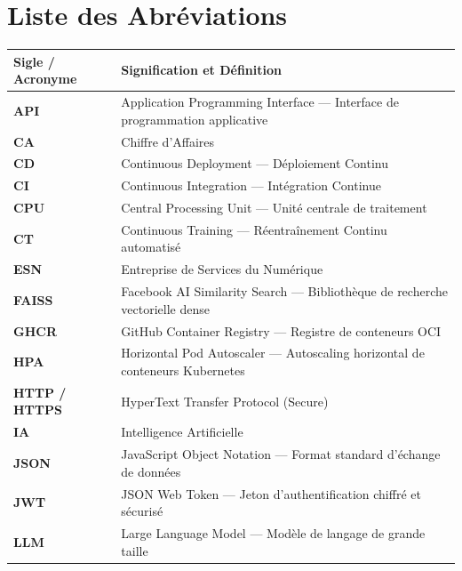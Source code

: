 \documentclass[11pt,a4paper,oneside]{report}
\begin{document}
\vspace{0.5cm}
\listoftables
{}
\newpage

\section*{Liste des Abréviations}

\noindent
\begin{center}
\small
{}
\begin{tabularx}{\textwidth}{@{}p{3.2cm}X@{}}
\toprule
\textbf{Sigle / Acronyme} & \textbf{Signification et Définition} \\ \midrule
\textbf{API} & Application Programming Interface --- Interface de programmation applicative \\
\textbf{CA} & Chiffre d'Affaires \\
\textbf{CD} & Continuous Deployment --- Déploiement Continu \\
\textbf{CI} & Continuous Integration --- Intégration Continue \\
\textbf{CPU} & Central Processing Unit --- Unité centrale de traitement \\
\textbf{CT} & Continuous Training --- Réentraînement Continu automatisé \\
\textbf{ESN} & Entreprise de Services du Numérique \\
\textbf{FAISS} & Facebook AI Similarity Search --- Bibliothèque de recherche vectorielle dense \\
\textbf{GHCR} & GitHub Container Registry --- Registre de conteneurs OCI \\
\textbf{HPA} & Horizontal Pod Autoscaler --- Autoscaling horizontal de conteneurs Kubernetes \\
\textbf{HTTP / HTTPS} & HyperText Transfer Protocol (Secure) \\
\textbf{IA} & Intelligence Artificielle \\
\textbf{JSON} & JavaScript Object Notation --- Format standard d'échange de données \\
\textbf{JWT} & JSON Web Token --- Jeton d'authentification chiffré et sécurisé \\
\textbf{LLM} & Large Language Model --- Modèle de langage de grande taille \\

\end{tabularx}
\end{center}
\end{document}
